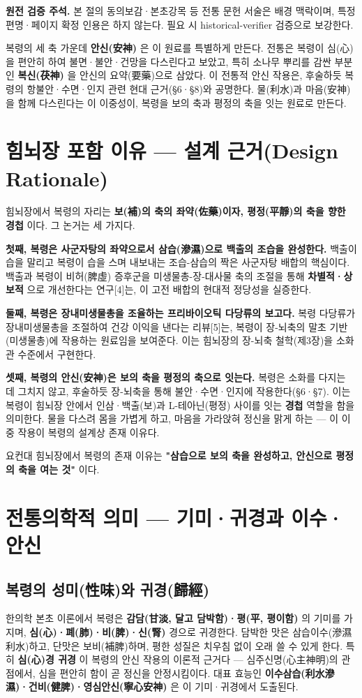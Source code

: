 \documentclass[11pt,oneside]{book}
\newenvironment{authnote}
  {\par\smallskip\begingroup\leftskip=7mm\rightskip=5mm\small\color{muted}\noindent\ignorespaces}
  {\par\endgroup\smallskip}
\begin{document}
\begin{authnote}\textbf{원전 검증 주석.} 본 절의 동의보감·본초강목 등 전통 문헌 서술은 배경 맥락이며, 특정 편명·페이지 확정 인용은 하지 않는다. 필요 시 historical-verifier 검증으로 보강한다.\end{authnote}
복령의 세 축 가운데 \textbf{안신(安神)} 은 이 원료를 특별하게 만든다. 전통은 복령이 심(心)을 편안히 하여 불면·불안·건망을 다스린다고 보았고, 특히 소나무 뿌리를 감싼 부분인 \textbf{복신(茯神)} 을 안신의 요약(要藥)으로 삼았다. 이 전통적 안신 작용은, 후술하듯 복령의 항불안·수면·인지 관련 현대 근거(§6·§8)와 공명한다. 물(利水)과 마음(安神)을 함께 다스린다는 이 이중성이, 복령을 보의 축과 평정의 축을 잇는 원료로 만든다.

\section{힘뇌장 포함 이유 — 설계 근거(Design Rationale)}
힘뇌장에서 복령의 자리는 \textbf{보(補)의 축의 좌약(佐藥)이자, 평정(平靜)의 축을 향한 경첩} 이다. 그 논거는 세 가지다.

\textbf{첫째, 복령은 사군자탕의 좌약으로서 삼습(滲濕)으로 백출의 조습을 완성한다.} 백출이 습을 말리고 복령이 습을 스며 내보내는 조습-삼습의 짝은 사군자탕 배합의 핵심이다. 백출과 복령이 비허(脾虛) 증후군을 미생물총-장-대사물 축의 조절을 통해 \textbf{차별적·상보적} 으로 개선한다는 연구[4]는, 이 고전 배합의 현대적 정당성을 실증한다.

\textbf{둘째, 복령은 장내미생물총을 조율하는 프리바이오틱 다당류의 보고다.} 복령 다당류가 장내미생물총을 조절하여 건강 이익을 낸다는 리뷰[5]는, 복령이 장-뇌축의 말초 기반(미생물총)에 작용하는 원료임을 보여준다. 이는 힘뇌장의 장-뇌축 철학(제3장)을 소화관 수준에서 구현한다.

\textbf{셋째, 복령의 안신(安神)은 보의 축을 평정의 축으로 잇는다.} 복령은 소화를 다지는 데 그치지 않고, 후술하듯 장-뇌축을 통해 불안·수면·인지에 작용한다(§6·§7). 이는 복령이 힘뇌장 안에서 인삼·백출(보)과 L-테아닌(평정) 사이를 잇는 \textbf{경첩} 역할을 함을 의미한다. 물을 다스려 몸을 가볍게 하고, 마음을 가라앉혀 정신을 맑게 하는 — 이 이중 작용이 복령의 설계상 존재 이유다.

요컨대 힘뇌장에서 복령의 존재 이유는 \textbf{"삼습으로 보의 축을 완성하고, 안신으로 평정의 축을 여는 것"} 이다.

\section{전통의학적 의미 — 기미·귀경과 이수·안신}
\subsection{복령의 성미(性味)와 귀경(歸經)}
한의학 본초 이론에서 복령은 \textbf{감담(甘淡, 달고 담박함)·평(平, 평이함)} 의 기미를 가지며, \textbf{심(心)·폐(肺)·비(脾)·신(腎)} 경으로 귀경한다. 담박한 맛은 삼습이수(滲濕利水)하고, 단맛은 보비(補脾)하며, 평한 성질은 치우침 없이 오래 쓸 수 있게 한다. 특히 \textbf{심(心)경 귀경} 이 복령의 안신 작용의 이론적 근거다 — 심주신명(心主神明)의 관점에서, 심을 편안히 함이 곧 정신을 안정시킴이다. 대표 효능인 \textbf{이수삼습(利水滲濕)·건비(健脾)·영심안신(寧心安神)} 은 이 기미·귀경에서 도출된다.
\end{document}
